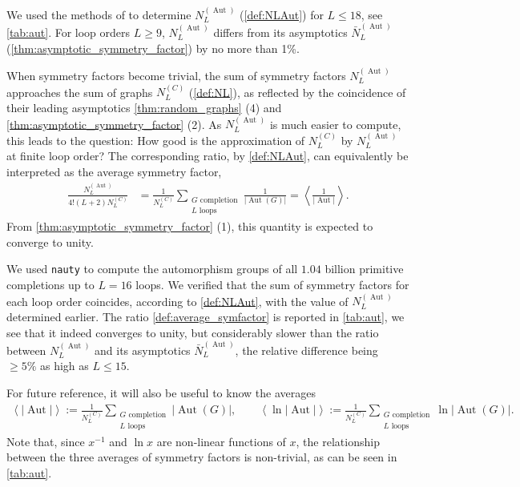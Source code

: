 \documentclass[12pt,a4paper]{article}
\newcommand{\abs}[1]{\lvert #1 \rvert}
\newcommand{\Aut}{\operatorname{Aut}}
\renewcommand{\|}{\rule[-0.4ex]{0.2ex}{1.2em}}
\begin{document}
We used the methods of \cite{cvitanovic_number_1978,borinsky_renormalized_2017} to determine $N^{(\Aut)}_L$ (\cref{def:NLAut}) for $L\leq 18$, see  \cref{tab:aut}. For loop orders $L\geq 9$, $ N^{(\Aut)}_L$ differs from its asymptotics $\bar N^{(\Aut)}_L$ (\cref{thm:asymptotic_symmetry_factor}) by no more than 1\%.

When symmetry factors become trivial, the sum of symmetry factors  $N^{(\Aut)}_L$ approaches the sum of graphs  $N^{(C)}_L$ (\cref{def:NL}), as reflected by the coincidence of their leading asymptotics \cref{thm:random_graphs} (4) and \cref{thm:asymptotic_symmetry_factor} (2). As  $N^{(\Aut)}_L$ is much easier to compute, this leads to the question: How good is the approximation of $N^{(C)}_L$ by $N^{(\Aut)}_L$ at finite loop order? The corresponding ratio, by \cref{def:NLAut}, can equivalently be interpreted as the average symmetry factor,
\begin{align}\label{def:average_symfactor}
	\frac{N^{(\Aut)}_L}{4! (L+2)N^{(C)}_L} &=  \frac{1}{N^{(C)}_L}\sum_{ \substack{G \text{ completion}\\  L \text{ loops}}} \frac{1 }{\abs{\Aut (G)}} = \left \langle \frac 1 {\abs{\Aut}} \right \rangle .
\end{align}
 From \cref{thm:asymptotic_symmetry_factor} (1), this quantity is expected to converge to unity.

We used \texttt{nauty} \cite{mckay_practical_2014} to compute the automorphism groups of all $1.04$ billion primitive completions up to $L=16$ loops.  We verified that the sum of symmetry factors for each loop order coincides, according to \cref{def:NLAut},  with the value of $N^{(\Aut)}_L$ determined earlier. 
The ratio \cref{def:average_symfactor} is reported in \cref{tab:aut}, we see that it indeed converges to unity, but considerably slower than   the ratio between $N^{(\Aut)}_L$ and its asymptotics $\bar N^{(\Aut)}_L$, the relative difference being $\geq 5\%$ as high as $L \leq 15$. 

For future reference, it will also be useful to know the averages
\begin{align*}
	\left \langle \abs{\Aut} \right \rangle  := \frac{1}{N^{(C)}_L}\sum_{\substack{G \text{ completion}\\ L \text{ loops} }} \abs{\Aut(G)}, \qquad 
	\left \langle \ln \abs{\Aut} \right \rangle   :=  \frac{1}{N^{(C)}_L}\sum_{ \substack{G \text{ completion}\\ L \text{ loops}}}  \ln \abs{\Aut(G)}.
\end{align*}
Note that, since $x^{-1}$ and $\ln x$ are non-linear functions of $x$, the relationship between the three averages of symmetry factors is non-trivial, as can be seen in \cref{tab:aut}.
\end{document}
